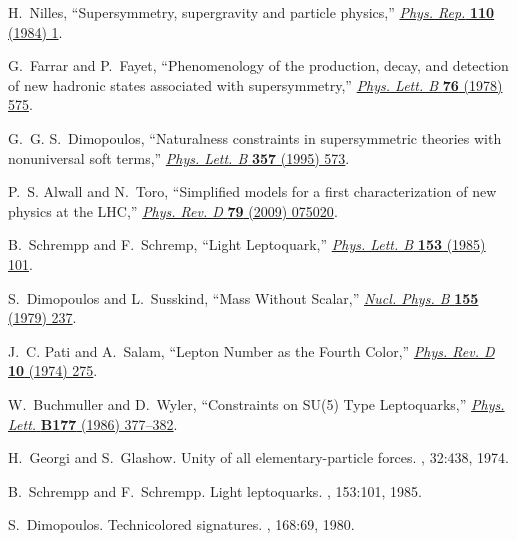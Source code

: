 \begin{thebibliography}{99}
\onehalfspacing
H.~Nilles, ``{Supersymmetry, supergravity and particle physics},''
  \href{http://dx.doi.org/10.1016/0370-1573(84)90008-5}{{\em Phys. Rep.}
  {\bfseries 110} (1984) 1}.

G.~Farrar and P.~Fayet, ``{Phenomenology of the production, decay, and
  detection of new hadronic states associated with supersymmetry},''
  \href{http://dx.doi.org/10.1016/0370-2693(78)90858-4}{{\em Phys. Lett. B}
  {\bfseries 76} (1978) 575}.

G.~G. S.~Dimopoulos, ``{Naturalness constraints in supersymmetric theories with
  nonuniversal soft terms},''
  \href{http://dx.doi.org/10.1016/0370-2693(95)00961-J}{{\em Phys. Lett. B}
  {\bfseries 357} (1995) 573}.

P.~S. Alwall and N.~Toro, ``{Simplified models for a first characterization of
  new physics at the LHC},''
  \href{http://dx.doi.org/10.1103/PhysRevD.79.075020}{{\em Phys. Rev. D}
  {\bfseries 79} (2009) 075020}.


B.~Schrempp and F.~Schremp, ``{Light Leptoquark},''
  \href{http://dx.doi.org/10.1016/0370-2693(85)91450-9}{{\em Phys. Lett. B}
  {\bfseries 153} (1985) 101}.

S.~Dimopoulos and L.~Susskind, ``{Mass Without Scalar},''
  \href{http://dx.doi.org/10.1016/0550-3213(81)90304-7}{{\em Nucl. Phys. B}
  {\bfseries 155} (1979) 237}.

J.~C. Pati and A.~Salam, ``{Lepton Number as the Fourth Color},''
  \href{http://dx.doi.org/10.1103/PhysRevD.10.275}{{\em Phys. Rev. D}
  {\bfseries 10} (1974) 275}.

W.~Buchmuller and D.~Wyler, ``{Constraints on SU(5) Type Leptoquarks},''
\href{http://dx.doi.org/10.1016/0370-2693(86)90771-9}{{\em Phys. Lett.}
  {\bfseries B177} (1986) 377--382}.

H.~Georgi and S.~Glashow.
\newblock Unity of all elementary-particle forces.
, 32:438, 1974.


B.~Schrempp and F.~Schrempp.
\newblock Light leptoquarks.
, 153:101, 1985.

S.~Dimopoulos.
\newblock Technicolored signatures.
, 168:69, 1980.



\end{thebibliography}
